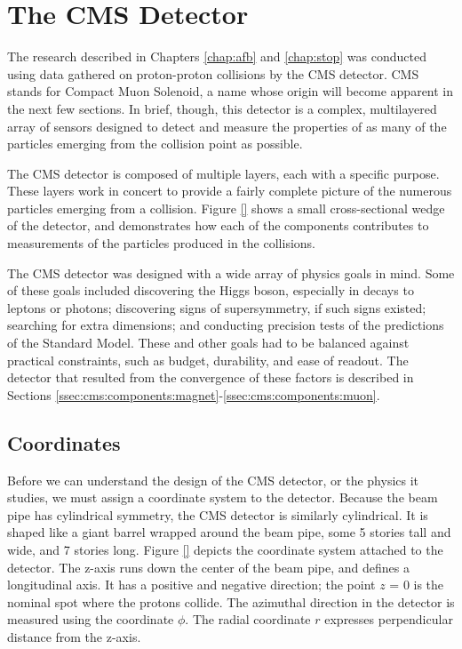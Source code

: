 \section{The CMS Detector}
\label{sec:cms}


The research described in Chapters \ref{chap:afb} and \ref{chap:stop}
was conducted using data gathered on proton-proton collisions by the
CMS detector. CMS stands for Compact Muon Solenoid, a name whose
origin will become apparent in the next few sections. In brief, though,
this detector is a complex, multilayered array of sensors designed to
detect and measure the properties of as many of the particles emerging
from the collision point as possible.


The CMS detector is composed of multiple layers, each with a specific
purpose. These layers work in concert to provide a fairly complete
picture of the numerous particles emerging from a collision.
Figure \ref{} shows a small cross-sectional wedge
of the detector, and demonstrates how each of the components
contributes to measurements of the particles produced in the
collisions.

The CMS detector was designed with a wide array of physics goals in
mind. Some of these goals included discovering the Higgs boson,
especially in decays to leptons or photons; discovering signs of
supersymmetry, if such signs existed; searching for extra
dimensions; and conducting precision tests of the predictions of the Standard Model.
These and other goals had to be balanced against practical
constraints, such as budget, durability, and ease of readout. The
detector that resulted from the convergence of these factors is
described in Sections
\ref{ssec:cms:components:magnet}-\ref{ssec:cms:components:muon}.

\subsection{Coordinates}
\label{ssec:cms:coordinates}


Before we can understand the design of the CMS detector, or the
physics it studies, we must assign a coordinate system to the detector.
Because the beam pipe has cylindrical symmetry, the CMS detector is
similarly cylindrical. It is shaped like a giant barrel wrapped around
the beam pipe, some 5 stories tall and wide, and 7 stories
long. Figure \ref{} depicts the coordinate system attached to the
detector. The z-axis runs down the center of the beam pipe, and
defines a longitudinal axis. It has a positive and negative direction;
the point $z$ = 0 is the nominal spot where the protons collide. The
azimuthal direction in the detector is measured using the coordinate
$\phi$. The radial coordinate $r$ expresses perpendicular distance from the z-axis.

